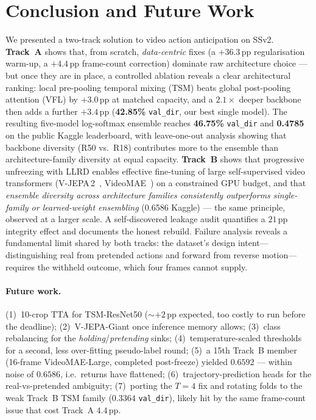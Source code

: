 \documentclass[10pt,twocolumn,letterpaper]{article}
\begin{document}
\section{Conclusion and Future Work}
\label{sec:conclusion}
We presented a two-track solution to video action anticipation on SSv2.
\textbf{Track~A} shows that, from scratch, \emph{data-centric} fixes
(a $+36.3$\,pp regularisation warm-up, a $+4.4$\,pp frame-count correction)
dominate raw architecture choice --- but once they are in place, a controlled
ablation reveals a clear architectural ranking: local pre-pooling temporal
mixing (TSM) beats global post-pooling attention (VFL) by $+3.0$\,pp at matched
capacity, and a $2.1\times$ deeper backbone then adds a further $+3.4$\,pp
(\textbf{42.85\%} \texttt{val\_dir}, our best single model). The resulting
five-model log-softmax ensemble reaches \textbf{46.75\%} \texttt{val\_dir} and
\textbf{0.4785} on the public Kaggle leaderboard, with leave-one-out analysis
showing that backbone diversity (R50 vs.\ R18) contributes more to the ensemble
than architecture-family diversity at equal capacity. \textbf{Track~B} shows
that progressive unfreezing with LLRD enables effective fine-tuning of large
self-supervised video transformers (V-JEPA\,2~\cite{bardes2025vjepa2},
VideoMAE~\cite{tong2022videomae}) on a constrained GPU budget, and that
\emph{ensemble diversity across architecture families consistently outperforms
single-family or learned-weight ensembling} (0.6586 Kaggle) --- the same
principle, observed at a larger scale. A self-discovered leakage audit
quantifies a $21$\,pp integrity effect and documents the honest rebuild.
Failure analysis reveals a fundamental limit shared by both tracks: the
dataset's design intent---distinguishing real from pretended actions and
forward from reverse motion---requires the withheld outcome, which four frames
cannot supply.

\paragraph{Future work.}
(1)~10-crop TTA for TSM-ResNet50 (${\sim}{+}2$\,pp expected, too costly to run
before the deadline); (2)~V-JEPA-Giant once inference memory allows;
(3)~class rebalancing for the \emph{holding}/\emph{pretending} sinks;
(4)~temperature-scaled thresholds for a second, less over-fitting pseudo-label
round; (5)~a 15th Track~B member (16-frame VideoMAE-Large, completed
post-freeze) yielded $0.6592$ --- within noise of $0.6586$, i.e.\ returns have
flattened; (6)~trajectory-prediction heads for the real-vs-pretended
ambiguity; (7)~porting the $T{=}4$ fix and rotating folds to the weak
Track~B TSM family ($0.3364$ \texttt{val\_dir}), likely hit by the same
frame-count issue that cost Track~A $4.4$\,pp.
\end{document}
